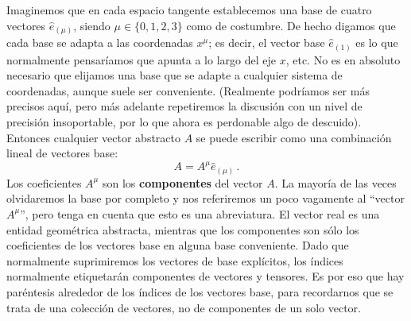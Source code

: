 \documentclass[11pt,b5paper,openany,twoside]{book}
\newcommand{\e}[1]{\hat{e}_{(#1)}}
\begin{document}
Imaginemos que en cada espacio tangente establecemos una base de cuatro vectores $\e\mu$, siendo $\mu\in\{0,1,2,3\}$ como de costumbre.
De hecho digamos que cada base se adapta a las coordenadas $x^\mu$; es decir, el vector base $\e1$ es lo que normalmente pensaríamos que apunta a lo largo del eje $x$, etc.
No es en absoluto necesario que elijamos una base que se adapte a cualquier sistema de coordenadas, aunque suele ser conveniente.
(Realmente podríamos ser más precisos aquí, pero más adelante repetiremos la discusión con un nivel de precisión insoportable, por lo que ahora es perdonable algo de descuido).
Entonces cualquier vector abstracto $A$ se puede escribir como una combinación lineal de vectores base:
\begin{equation}
A = A^\mu \e\mu\,.\label{1.23}
\end{equation}
Los coeficientes $A^\mu$ son los {\bf componentes} del vector $A$.
La mayoría de las veces olvidaremos la base por completo y nos referiremos un poco vagamente al ``vector $A^\mu$'', pero tenga en cuenta que esto es una abreviatura.
El vector real es una entidad geométrica abstracta, mientras que los componentes son sólo los coeficientes de los vectores base en alguna base conveniente.
Dado que normalmente suprimiremos los vectores de base explícitos, los índices normalmente etiquetarán componentes de vectores y tensores.
Es por eso que hay paréntesis alrededor de los índices de los vectores base, para recordarnos que se trata de una colección de vectores, no de componentes de un solo vector.
\end{document}
